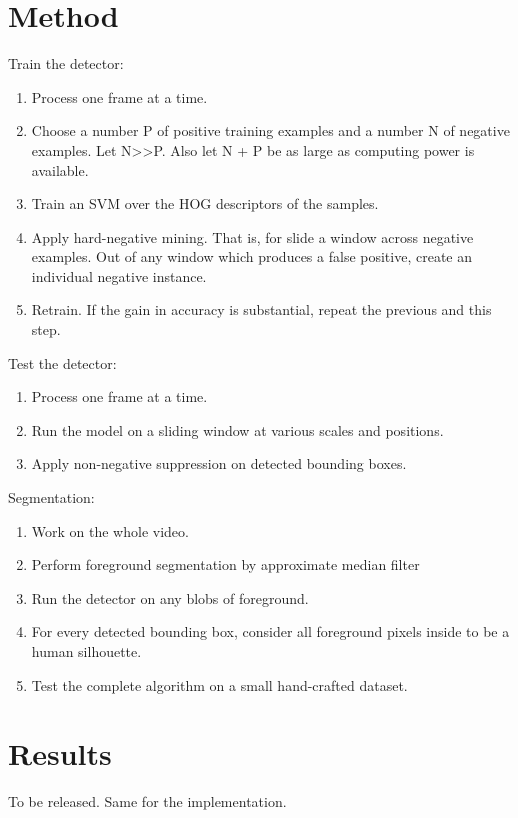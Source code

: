 \documentclass{article}
\begin{document}
\section{Method}
Train the detector:
\begin{enumerate}
\item{Process one frame at a time.}
\item{Choose a number P of positive training examples and a number N of negative examples. Let N>>P. Also let N + P be as large as computing power is available.}
\item{Train an SVM over the HOG descriptors of the samples.}
\item{Apply hard-negative mining. That is, for slide a window across negative examples. Out of any window which produces a false positive, create an individual negative instance.}
\item{Retrain. If the gain in accuracy is substantial, repeat the previous and this step.}
\end{enumerate}

Test the detector:
\begin{enumerate}
\item{Process one frame at a time.}
\item{Run the model on a sliding window at various scales and positions.}
\item{Apply non-negative suppression on detected bounding boxes.}
\end{enumerate}

Segmentation:
\begin{enumerate}
\item{Work on the whole video.}
\item{Perform foreground segmentation by approximate median filter\cite{amf}}
\item{Run the detector on any blobs of foreground.}
\item{For every detected bounding box, consider all foreground pixels inside to be a human silhouette.}
\item{Test the complete algorithm on a small hand-crafted dataset.}
\end{enumerate}


\section{Results}
To be released.
Same for the implementation.


\printbibliography
\end{document}
